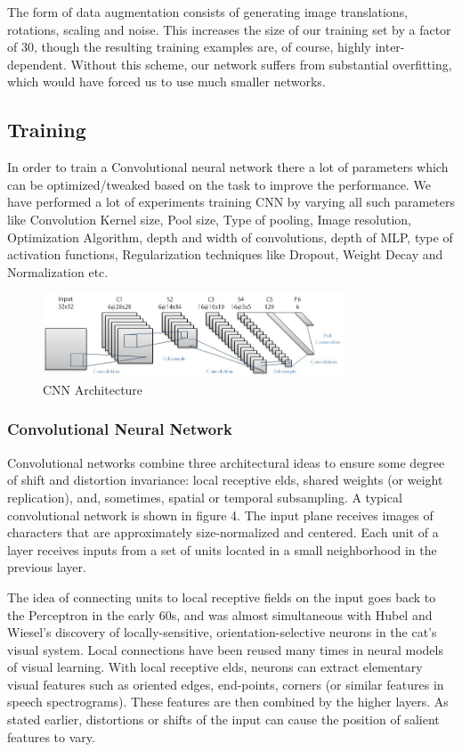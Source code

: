 \documentclass[conference]{IEEEtran}
\begin{document}
The form of data augmentation consists of generating image translations, rotations, scaling and noise. This increases the size of our training set by a factor of 30, though the resulting training examples are, of course, highly inter-dependent. Without this scheme, our network suffers from substantial overfitting, which would have forced us to use much smaller networks.

\subsection{Training}
In order to train a Convolutional neural network there a lot of parameters which can be optimized/tweaked based on the task to improve the performance. We have performed a lot of experiments training CNN by varying all such parameters like Convolution Kernel size, Pool size, Type of pooling, Image resolution, Optimization Algorithm, depth and width of convolutions, depth of MLP, type of activation functions, Regularization techniques like Dropout, Weight Decay and Normalization etc.
\begin{figure}[h]
\includegraphics[width=9cm]{cnnarchitecture}
\caption{CNN Architecture}
\end{figure}

\subsubsection{Convolutional Neural Network}
Convolutional networks combine three architectural ideas to ensure some degree of shift and distortion invariance: local receptive elds, shared weights (or weight replication), and, sometimes, spatial or temporal subsampling. A typical convolutional network is shown in figure 4. The input plane receives images of characters that are approximately size-normalized and centered. Each unit of a layer receives inputs from a set of units located in a small neighborhood in the previous layer.

The idea of connecting units to local receptive fields on the input goes back to the Perceptron in the early 60s, and was almost simultaneous with Hubel and Wiesel's discovery of locally-sensitive, orientation-selective neurons in the cat's visual system. Local connections have been reused many times in neural models of visual learning. With local receptive elds, neurons can
extract elementary visual features such as oriented edges, end-points, corners (or similar features in speech spectrograms). These features are then combined by the higher layers. As stated earlier, distortions or shifts of the input can cause the position of salient features to vary.
\end{document}
